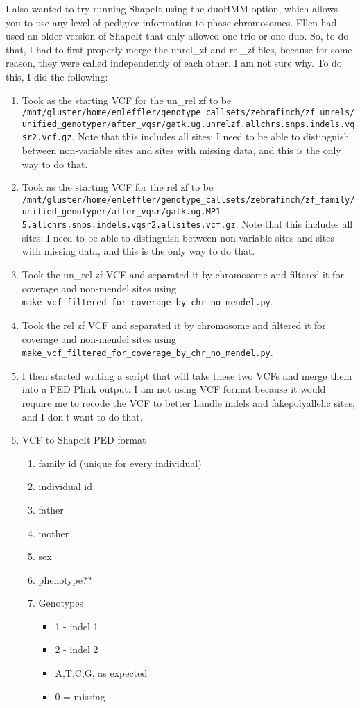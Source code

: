 \documentclass[idxtotoc,hyperref,openany,oneside]{labbook} %
\begin{document}
I also wanted to try running ShapeIt using the duoHMM option, which allows you to use any level of pedigree information to phase chromosomes. Ellen had used an older version of ShapeIt that only allowed one trio or one duo. So, to do that, I had to first properly merge the unrel\_zf and rel\_zf files, because for some reason, they were called independently of each other. I am not sure why. To do this, I did the following:
\begin{enumerate}
\item Took as the starting VCF for the un\_rel zf to be \verb+/mnt/gluster/home/emleffler/genotype_callsets/zebrafinch/zf_unrels/unified_genotyper/after_vqsr/gatk.ug.unrelzf.allchrs.snps.indels.vqsr2.vcf.gz+. Note that this includes all sites; I need to be able to distinguish between non-variable sites and sites with missing data, and this is the only way to do that.
\item Took as the starting VCF for the rel zf to be \verb+/mnt/gluster/home/emleffler/genotype_callsets/zebrafinch/zf_family/unified_genotyper/after_vqsr/gatk.ug.MP1-5.allchrs.snps.indels.vqsr2.allsites.vcf.gz+. Note that this includes all sites; I need to be able to distinguish between non-variable sites and sites with missing data, and this is the only way to do that.
\item Took the un\_rel zf VCF and separated it by chromosome and filtered it for coverage and non-mendel sites using \verb+make_vcf_filtered_for_coverage_by_chr_no_mendel.py+.
\item Took the rel zf VCF and separated it by chromosome and filtered it for coverage and non-mendel sites using \verb+make_vcf_filtered_for_coverage_by_chr_no_mendel.py+.
\item I then started writing a script that will take these two VCFs and merge them into a PED Plink output. I am not using VCF format because it would require me to recode the VCF to better handle indels and \"fake\" polyallelic sites, and I don't want to do that.
\item VCF to ShapeIt PED format
\begin{enumerate}
\item family id (unique for every individual)
\item individual id 
\item father
\item mother
\item sex
\item phenotype??
\item Genotypes
\begin{itemize}
\item 1 - indel 1
\item 2 - indel 2
\item A,T,C,G, as expected
\item 0 = missing
\end{itemize}
\end{enumerate}
\end{enumerate}
\end{document}
